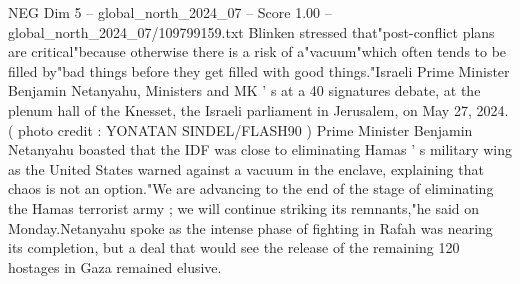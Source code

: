 \begin{textsample}{NEG Dim 5 – global\_north\_2024\_07 – Score 1.00 – global\_north\_2024\_07/109799159.txt}  \label{ex:f5_neg_150}
Blinken stressed that"post-conflict plans are critical"because otherwise there is a risk of a"vacuum"which often tends to be filled by"bad things before they get filled with good things."Israeli Prime Minister Benjamin Netanyahu, Ministers and MK ' s at a 40 signatures debate, at the plenum hall of the Knesset, the Israeli parliament in Jerusalem, on May 27, 2024. ( photo credit : YONATAN SINDEL/FLASH90 ) Prime Minister Benjamin Netanyahu boasted that the IDF was close to eliminating Hamas ' s military wing as the United States warned against a vacuum in the enclave, explaining that chaos is not an option."We are advancing to the end of the stage of eliminating the Hamas terrorist army ; we will continue striking its remnants,"he said on Monday.Netanyahu spoke as the intense phase of fighting in Rafah was nearing its completion, but a deal that would see the release of the remaining 120 hostages in Gaza remained elusive.

\end{textsample}
